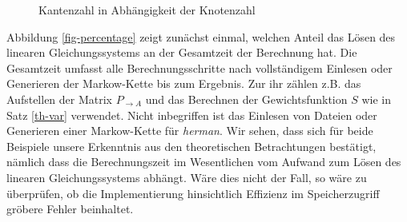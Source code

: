 \documentclass[a4paper]{article}
\newcommand{\mc}{Markow-Kette}
\theoremstyle{nonumberplain}
\begin{document}
	\begin{figure}
		\caption{Kantenzahl in Abhängigkeit der Knotenzahl}
		\label{mc-size}
		\centering
	\end{figure}
	
	
	Abbildung \ref{fig-percentage} zeigt zunächst einmal, welchen Anteil das Lösen des linearen Gleichungssystems an der Gesamtzeit der Berechnung hat. Die Gesamtzeit umfasst alle Berechnungsschritte nach vollständigem Einlesen oder Generieren der \mc{} bis zum Ergebnis. Zur ihr zählen z.B. das Aufstellen der Matrix $P_{\rightarrow A}$ und das Berechnen der Gewichtsfunktion $S$ wie in Satz \ref{th-var} verwendet. Nicht inbegriffen ist das Einlesen von Dateien oder Generieren einer \mc{} für \textit{herman}. Wir sehen, dass sich für beide Beispiele unsere Erkenntnis aus den theoretischen Betrachtungen bestätigt, nämlich dass die Berechnungszeit im Wesentlichen vom Aufwand zum Lösen des linearen Gleichungssystems abhängt. Wäre dies nicht der Fall, so wäre zu überprüfen, ob die Implementierung hinsichtlich Effizienz im Speicherzugriff gröbere Fehler beinhaltet.
	
	
\end{document}
